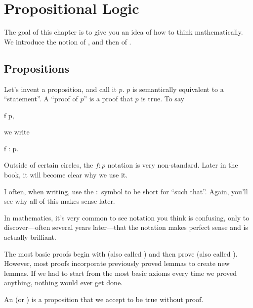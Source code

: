 \chapter{Propositional Logic}
\label{propositions}

The goal of this chapter is to give you an idea of how to think
mathematically. We introduce the notion of , and
then of .

\section{Propositions}

Let's invent a proposition, and call it $p$. $p$ is semantically
equivalent to a ``statement''. A ``proof of $p$'' is a proof that $p$
is true. To say

\begin{zz}
  f  p,
\end{zz}

we write

\begin{zz}
  f : p.
\end{zz}

\begin{remark}
  Outside of certain circles, the $f : p$ notation is very
  non-standard. Later in the book, it will become clear why we use it.

  I often, when writing, use the $:$ symbol to be short for ``such
  that''. Again, you'll see why all of this makes sense later.
\end{remark}

\begin{aside}
  In mathematics, it's very common to see notation you think is
  confusing, only to discover---often several years later---that the
  notation makes perfect sense and is actually brilliant.
\end{aside}

The most basic proofs begin with  (also called
) and then prove  (also called
). However, most proofs incorporate previously proved
lemmas to create new lemmas. If we had to start from the most basic
axioms every time we proved anything, nothing would ever get done.

\begin{definition}
  \label{def:axiom}
  \label{def:postulate}
  An  (or ) is a proposition that we
  accept to be true without proof.
\end{definition}

